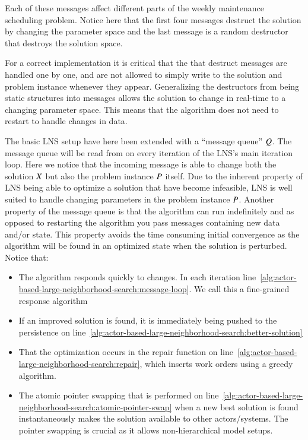 Each of these messages affect different parts of the weekly maintenance
scheduling  problem. Notice here that the first four messages destruct the
solution by changing the parameter space and the last message is a random
destructor that destroys the solution space.

For a correct implementation it is critical that the that destruct messages
are  handled one by one, and are not allowed to simply write to the solution and
problem instance whenever they appear. Generalizing the destructors from being
static structures into messages allows the solution to change in real-time to a
changing parameter space. This means that the algorithm does not need to restart
to handle changes in data.



The basic LNS setup have here been extended with a ``message queue'' $
Q$. The message queue will be read from on every iteration of
the LNS's main iteration loop. Here we notice that the incoming message is
able to change both the solution $X$ but also the problem instance $
P$ itself. Due to the inherent property of LNS being able to
optimize a solution that have become infeasible, LNS is well suited to handle
changing parameters  in the problem instance $P$. Another
property of the message queue is  that the algorithm can run indefinitely and
as opposed to restarting the algorithm you pass messages containing new data
and/or state. This property avoids the time consuming initial convergence as the
algorithm will be found in an optimized state when the solution is perturbed.
Notice that:

\begin{itemize}
    \item The algorithm responds quickly to changes. In each iteration
		line~\ref{alg:actor-based-large-neighborhood-search:message-loop}. We
		call this a fine-grained response algorithm     
	\item If an improved
		solution is found, it is immediately being pushed to the persistence
		on line~\ref{alg:actor-based-large-neighborhood-search:better-solution}
	\item That the optimization occurs in the repair function on
		line~\ref{alg:actor-based-large-neighborhood-search:repair},
		which inserts work orders using a greedy algorithm.  	
	\item The atomic pointer swapping that is performed on
		line~\ref{alg:actor-based-large-neighborhood-search:atomic-pointer-swap} when a
		new best solution is found instantaneously makes the solution available to other
		actors/systems. The pointer swapping is crucial as it allows non-hierarchical
		model setups.
\end{itemize}


